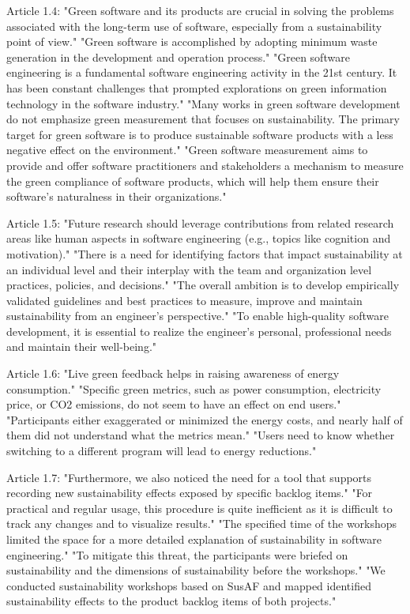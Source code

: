 \begin{itemize}
Article 1.4:
"Green software and its products are crucial in solving the problems associated with the long-term use of software, especially from a sustainability point of view." 
"Green software is accomplished by adopting minimum waste generation in the development and operation process." 
"Green software engineering is a fundamental software engineering activity in the 21st century. It has been constant challenges that prompted explorations on green information technology in the software industry." 
"Many works in green software development do not emphasize green measurement that focuses on sustainability. The primary target for green software is to produce sustainable software products with a less negative effect on the environment." 
"Green software measurement aims to provide and offer software practitioners and stakeholders a mechanism to measure the green compliance of software products, which will help them ensure their software's naturalness in their organizations."

Article 1.5:
"Future research should leverage contributions from related research areas like human aspects in software engineering (e.g., topics like cognition and motivation)." 
"There is a need for identifying factors that impact sustainability at an individual level and their interplay with the team and organization level practices, policies, and decisions." 
"The overall ambition is to develop empirically validated guidelines and best practices to measure, improve and maintain sustainability from an engineer’s perspective." 
"To enable high-quality software development, it is essential to realize the engineer’s personal, professional needs and maintain their well-being."

Article 1.6:
"Live green feedback helps in raising awareness of energy consumption." 
"Specific green metrics, such as power consumption, electricity price, or CO2 emissions, do not seem to have an effect on end users." 
"Participants either exaggerated or minimized the energy costs, and nearly half of them did not understand what the metrics mean." 
"Users need to know whether switching to a different program will lead to energy reductions."

Article 1.7:
"Furthermore, we also noticed the need for a tool that supports recording new sustainability effects exposed by specific backlog items." 
"For practical and regular usage, this procedure is quite inefficient as it is difficult to track any changes and to visualize results." 
"The specified time of the workshops limited the space for a more detailed explanation of sustainability in software engineering." 
"To mitigate this threat, the participants were briefed on sustainability and the dimensions of sustainability before the workshops." 
"We conducted sustainability workshops based on SusAF and mapped identified sustainability effects to the product backlog items of both projects." 


\end{itemize}
